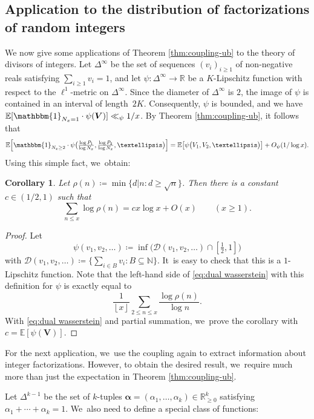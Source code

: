 \documentclass[10pt,a4paper]{amsart}
\newcommand{\bV}{{\boldsymbol V}}
\newcommand{\RR}{\mathbb{R}}
\newcommand{\EE}{\mathbb{E}}
\newcommand{\boldalpha}{\boldsymbol{\alpha}}
\newcommand{\one}{\mathbbm{1}}
\newcommand{\floor}[1]{\left\lfloor #1 \right\rfloor}
\newcommand{\simplex}{\Delta^{k-1}}
\newcommand{\bg}{\big}
\newcommand{\bgg}{\Big}
\theoremstyle{plain}
\newtheorem{cor}{Corollary}[section]
\theoremstyle{definition}
\providecommand{\Subsection}{\subsection}
\begin{document}
\Subsection{Application to the distribution of factorizations of random integers}

We now give some applications of Theorem \ref{thm:coupling-ub} to the theory of divisors of integers.
Let $\Delta^{\infty}$ be the set of sequences $(v_i)_{i \ge 1}$ of non-negative reals satisfying $\sum_{i \ge 1} v_i = 1$, and let $\psi\colon \Delta^{\infty} \to \RR$ be a $K$-Lipschitz function with respect to the $\ell^1$-metric on $\Delta^\infty$. Since the diameter of $\Delta^\infty$ is $2$, the image of $\psi$ is contained in an interval of length~$2K$. Consequently, $\psi$ is bounded, and we have $\EE[\one_{N_x = 1}\cdot \psi(\bV)] \ll_{\psi} 1/x$. By Theorem \ref{thm:coupling-ub}, it follows that
\begin{equation}
\label{eq:dual wasserstein}
\EE\bgg[\one_{N_x \ge 2}\cdot \psi\bg(\tfrac{\log P_1}{\log N_x}, \tfrac{\log P_2}{\log N_x}, \ldots\bg)\bgg] = \EE\bg[\psi\bg(V_1, V_2, \ldots\bg)\bg] + O_\psi(1/\log x).
\end{equation}
Using this simple fact, we~obtain:
\begin{cor}
Let $\rho(n) \coloneqq \min\{d|n : d\ge \sqrt n\}$. Then there is a constant $c \in (1/2,1)$ such that
\[
\sum_{n\le x} \log \rho(n) = cx\log x + O(x) \qquad (x \ge 1).
\]
\end{cor}

\begin{proof}
Let
\[
\psi(v_1, v_2, \ldots) \coloneqq \inf \big( \mathcal D(v_1, v_2, \ldots) \cap [\tfrac{1}{2}, 1]\big)
\]
with $\mathcal D(v_1, v_2, \ldots) \coloneqq \{\sum_{i \in B} v_i : B\subseteq \mathbb N\}$. It~is easy to check that this is a $1$-Lipschitz function. Note that the left-hand side of \eqref{eq:dual wasserstein} with this definition for $\psi$ is exactly equal to
\[
\frac{1}{\floor x} \sum_{2 \le n \le x} \frac{\log \rho(n)}{\log n}.
\]
With \eqref{eq:dual wasserstein} and partial summation, we~prove the corollary with $c = \EE[\psi(\bV)]$.
\end{proof}

For the next application, we~use the coupling again to extract information about integer factorizations. However, to obtain the desired result, we~require much more than just the expectation in Theorem \ref{thm:coupling-ub}.

Let $\simplex$ be the set of $k$-tuples $\boldalpha=(\alpha_1, \ldots, \alpha_k) \in \RR^k_{\ge 0}$ satisfying $\alpha_1+\cdots+\alpha_k=1$. We~also need to define a special class of functions:
\end{document}
